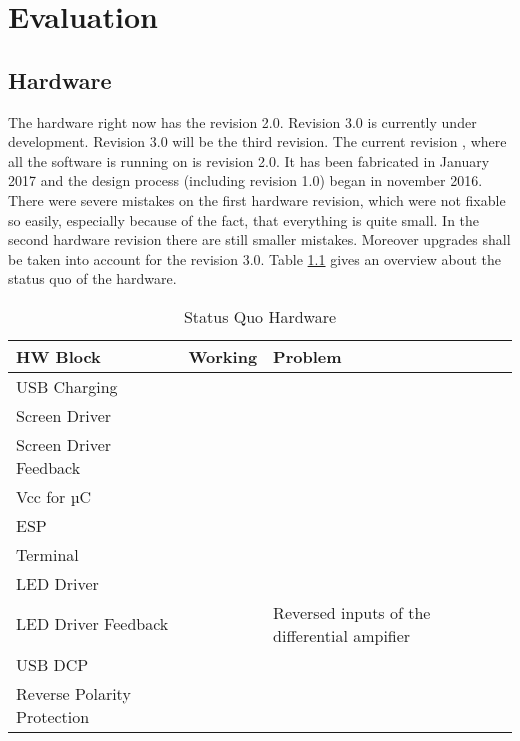 \chapter{Evaluation}
\label{chap:evaluation}
\section{Hardware}
\label{sec:evaluation_hw}
The hardware right now has the revision 2.0. Revision 3.0 is currently under
development. Revision 3.0 will be the third revision. The current revision
, where all the software is running on is revision 2.0. It has been fabricated in
January 2017 and the design process (including revision 1.0) began in november
2016. There were severe mistakes on the first hardware revision, which were not
fixable so easily, especially because of the fact, that everything is quite
small. In the second hardware revision there are still smaller mistakes.
Moreover upgrades shall be taken into account for the revision 3.0. 
\newpar
Table \ref{tab:hw_status_quo} gives an overview about the status quo of the hardware.
\begin{table}[H]
	\centering
	\begin{tabularx}{\textwidth}{llX}
		\textbf{HW Block}  	& \textbf{Working}& \textbf{Problem}  	\\\hline
		USB Charging 	& \checkmark	& 				\\
		Screen Driver  	& \checkmark    & 				\\
		Screen Driver Feedback& \checkmark    & 				\\
		Vcc for µC   	& \checkmark    & 				\\
		ESP   		& \checkmark    &                             	\\
		Terminal 	& \checkmark	&				\\
		LED Driver	& \checkmark	& 				\\
		LED Driver Feedback & & Reversed inputs of the differential ampifier \\
		USB DCP		& \checkmark	& 				\\
		Reverse Polarity Protection & \checkmark & \\
		\hline
	\end{tabularx}
	\caption{Status Quo Hardware}
	\label{tab:hw_status_quo}
\end{table}


